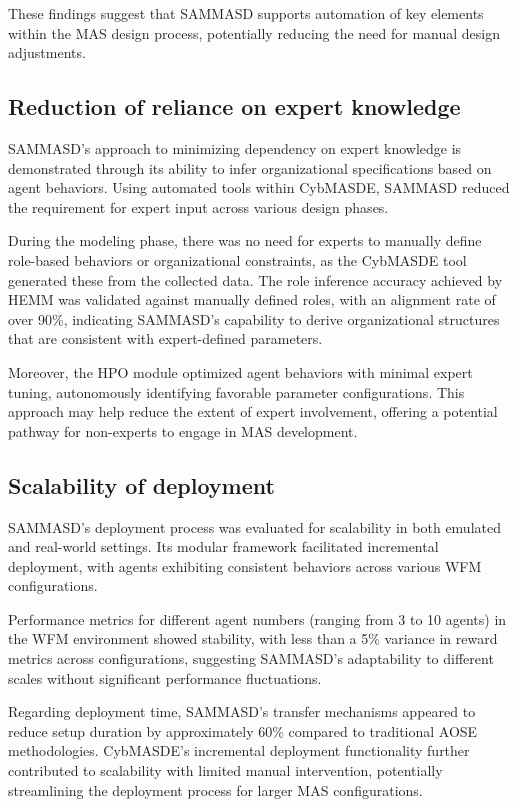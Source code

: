 \documentclass[sigconf,anonymous]{aamas}
\begin{document}
These findings suggest that SAMMASD supports automation of key elements within the MAS design process, potentially reducing the need for manual design adjustments.

\subsection{Reduction of reliance on expert knowledge}

SAMMASD’s approach to minimizing dependency on expert knowledge is demonstrated through its ability to infer organizational specifications based on agent behaviors. Using automated tools within CybMASDE, SAMMASD reduced the requirement for expert input across various design phases.

During the modeling phase, there was no need for experts to manually define role-based behaviors or organizational constraints, as the CybMASDE tool generated these from the collected data. The role inference accuracy achieved by HEMM was validated against manually defined roles, with an alignment rate of over 90\%, indicating SAMMASD’s capability to derive organizational structures that are consistent with expert-defined parameters. 

Moreover, the HPO module optimized agent behaviors with minimal expert tuning, autonomously identifying favorable parameter configurations. This approach may help reduce the extent of expert involvement, offering a potential pathway for non-experts to engage in MAS development.

\subsection{Scalability of deployment}

SAMMASD’s deployment process was evaluated for scalability in both emulated and real-world settings. Its modular framework facilitated incremental deployment, with agents exhibiting consistent behaviors across various WFM configurations.

Performance metrics for different agent numbers (ranging from 3 to 10 agents) in the WFM environment showed stability, with less than a 5\% variance in reward metrics across configurations, suggesting SAMMASD’s adaptability to different scales without significant performance fluctuations.

Regarding deployment time, SAMMASD’s transfer mechanisms appeared to reduce setup duration by approximately 60\% compared to traditional AOSE methodologies. CybMASDE’s incremental deployment functionality further contributed to scalability with limited manual intervention, potentially streamlining the deployment process for larger MAS configurations.
\end{document}
